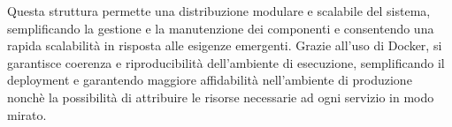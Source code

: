 Questa struttura permette una distribuzione modulare e scalabile del sistema, semplificando la gestione e la manutenzione dei componenti e consentendo una rapida scalabilità in risposta alle esigenze emergenti. Grazie all'uso di Docker, si garantisce coerenza e riproducibilità dell'ambiente di esecuzione, semplificando il deployment e garantendo maggiore affidabilità nell'ambiente di produzione nonchè la possibilità di attribuire le risorse necessarie ad ogni servizio in modo mirato.
